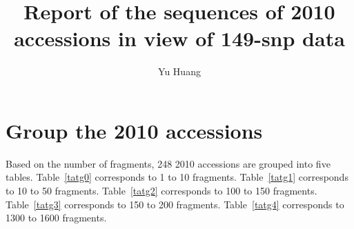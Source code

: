\documentclass[a2paper, 10pt]{article}
\title{Report of the sequences of 2010 accessions in view of 149-snp data}
\author{Yu Huang}
\begin{document}
\maketitle

\begin{abstract}
\end{abstract}

\section{Group the 2010 accessions}

Based on the number of fragments, 248 2010 accessions are grouped into five tables. Table~\ref{tatg0} corresponds to 1 to 10 fragments. Table~\ref{tatg1} corresponds to 10 to 50 fragments. Table~\ref{tatg2} corresponds to 100 to 150 fragments. Table~\ref{tatg3} corresponds to 150 to 200 fragments. Table~\ref{tatg4} corresponds to 1300 to 1600 fragments.



\end{document}
